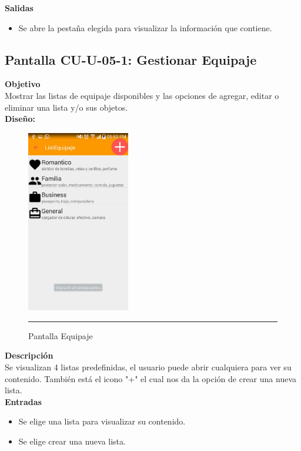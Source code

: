 \textbf{Salidas}
\begin{itemize}
\item Se abre la pestaña elegida para visualizar la información que contiene.
\end{itemize}
\clearpage
\hypertarget{CU-U-05-1}{}
\subsection{Pantalla CU-U-05-1: Gestionar Equipaje}
\textbf{Objetivo}\\
Mostrar las listas de equipaje disponibles y las opciones de agregar, editar o eliminar una lista y/o sus objetos. \\

\textbf{Diseño:}
\begin{figure}[h]
	\centering
		\includegraphics[width=0.4\textwidth]{Figuras/intListaEquipaje.jpg}
		\rule{30em}{0.5pt}
	\caption[Pantalla Equipaje]{Pantalla Equipaje}
	\label{fig:intListaEquipaje}
\end{figure}

\textbf{Descripción} \\
Se visualizan 4 listas predefinidas, el usuario puede abrir cualquiera para ver su contenido. También está el icono "+" el cual nos da la opción de crear una nueva lista. \\

\textbf{Entradas}
\begin{itemize}
\item Se elige una lista para visualizar su contenido.
\item Se elige crear una nueva lista.
\end{itemize}

